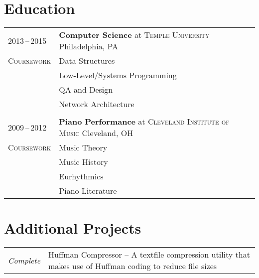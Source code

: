\documentclass[a4paper,11pt]{article}
\begin{document}
\section{Education}
\begin{tabularx}{\textwidth}{@{}p{6em}|X@{}}
    2013\,--\,2015      & \textbf{Computer Science} at \textsc{Temple University} \hfill Philadelphia, PA \\
    \textsc{Coursework} & \footnotesize Data Structures \\
                        & \footnotesize Low-Level/Systems Programming \\
                        & \footnotesize QA and Design \\
                        & \footnotesize Network Architecture \\
    \multicolumn{2}{c}{} \\

    2009\,--\,2012      & \textbf{Piano Performance} at \textsc{Cleveland Institute of Music} \hfill Cleveland, OH \\
    \textsc{Coursework} & \footnotesize Music Theory \\
                        & \footnotesize Music History \\
                        & \footnotesize Eurhythmics \\
                        & \footnotesize Piano Literature \\
\end{tabularx}

\section{Additional Projects}
\begin{tabularx}{\textwidth}{@{}p{6em}|X@{}}
    \textit{Complete} & Huffman Compressor -- A textfile compression utility that makes use of Huffman coding to reduce file sizes
\end{tabularx}
\end{document}
